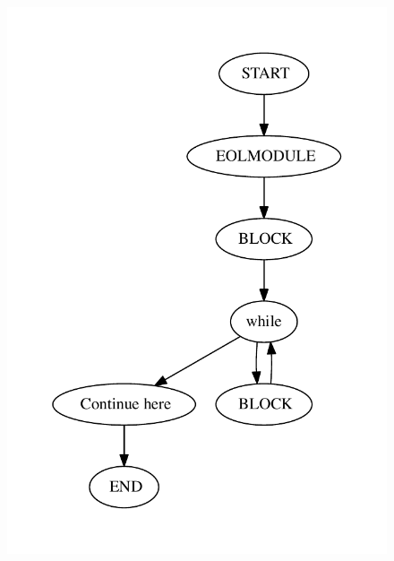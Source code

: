 \begin{figure}
\begin{minipage}{.3\textwidth}
  \includegraphics[scale=0.5]{figures/statements/while_CFG.pdf}
    \caption{}
  \label{fig:whileCFG}
\end{minipage}
\end{figure}